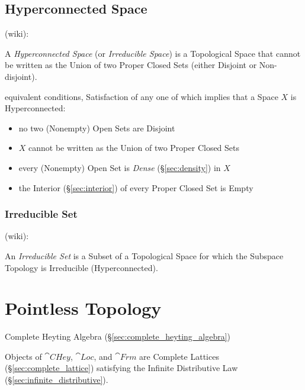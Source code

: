 \subsection{Hyperconnected Space}\label{sec:hyperconnected_space}

(wiki):

A \emph{Hyperconnected Space} (or \emph{Irreducible Space}) is a Topological
Space that cannot be written as the Union of two Proper Closed Sets (either
Disjoint or Non-disjoint).

equivalent conditions, Satisfaction of any one of which implies that a Space
$X$ is Hyperconnected:
\begin{itemize}
  \item no two (Nonempty) Open Sets are Disjoint
  \item $X$ cannot be written as the Union of two Proper Closed Sets
  \item every (Nonempty) Open Set is \emph{Dense} (\S\ref{sec:density}) in $X$
  \item the Interior (\S\ref{sec:interior}) of every Proper Closed Set is Empty
\end{itemize}



\subsubsection{Irreducible Set}\label{sec:irreducible_set}

(wiki):

An \emph{Irreducible Set} is a Subset of a Topological Space for which the
Subspace Topology is Irreducible (Hyperconnected).



\section{Pointless Topology}\label{sec:pointless_topology}

Complete Heyting Algebra (\S\ref{sec:complete_heyting_algebra})

Objects of $\cat{CHey}$, $\cat{Loc}$, and $\cat{Frm}$ are Complete
Lattices (\S\ref{sec:complete_lattice}) satisfying the Infinite
Distributive Law (\S\ref{sec:infinite_distributive}).

